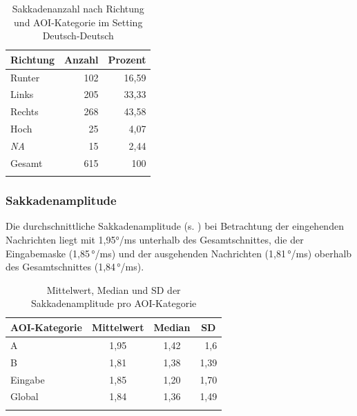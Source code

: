\begin{table}
\begin{minipage}{0.5\textwidth}
\begin{tabular}{lrr}
            \multicolumn{1}{c}{Richtung} & \multicolumn{1}{c}{Anzahl} & \multicolumn{1}{c}{Prozent}  \\ 
            \midrule
            Runter & 102 & 16,59 \\ 
            Links & 205 & 33,33 \\ 
            Rechts & 268 & 43,58 \\ 
            Hoch & 25 & 4,07 \\ 
            \emph{NA} & 15 & 2,44 \\ 
            \midrule
            {Gesamt} & 615 & 100 \\ 
            \lspbottomrule
         \end{tabular}    
    \end{minipage}
      \caption{Sakkadenanzahl nach Richtung und AOI-Kategorie im Setting Deutsch-Deutsch}
    \label{K6:tab:saccount:direction:DeDe}
\end{table}



\subsubsection{Sakkadenamplitude}
\label{K6:subsubsec:sacamp:DeDe}


Die durchschnittliche Sakkadenamplitude (s. ) bei Betrachtung der eingehenden Nachrichten liegt mit 1,95°/ms unterhalb des Gesamtschnittes, die der Eingabemaske (1,85\,°/ms) und der ausgehenden Nachrichten (1,81\,°/ms) oberhalb des Gesamtschnittes (1,84\,°/ms). 


\begin{table}
    \begin{tabular}{lccr}  
    \lsptoprule
        {AOI-Kategorie} & {Mittelwert} & {Median} & \multicolumn{1}{c}{SD} \\ 
        \midrule
        A  & 1,95 & 1,42 & 1,6 \\
        B  & 1,81 & 1,38 & 1,39\\ 
        Eingabe   & 1,85 & 1,20 & 1,70\\ 
        \midrule
        Global  & 1,84 & 1,36 & 1,49\\ 
        \lspbottomrule
    \end{tabular}
    \caption[Mittelwert, Median und SD der Sakkadenamplitude]{Mittelwert, Median und SD der Sakkadenamplitude pro AOI-Kategorie}
    \label{K6:tab:DeDe:sacamp}
\end{table}

